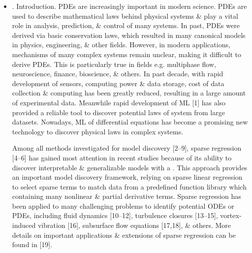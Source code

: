 \documentclass{article}
\begin{document}
\begin{itemize}
	\item {. Introduction.} PDEs are increasingly important in modern science. PDEs are used to describe mathematical laws behind physical systems \& play a vital role in analysis, prediction, \& control of many systems. In past, PDEs were derived via basic conservation laws, which resulted in many canonical models in physics, engineering, \& other fields. However, in modern applications, mechanisms of many complex systems remain unclear, making it difficult to derive PDEs. This is particularly true in fields e.g. multiphase flow, neuroscience, finance, bioscience, \& others. In past decade, with rapid development of sensors, computing power \& data storage, cost of data collection \& computing has been greatly reduced, resulting in a large amount of experimental data. Meanwhile rapid development of ML [1] has also provided a reliable tool to discover potential laws of system from large datasets. Nowadays, ML of differential equations has become a promising new technology to discover physical laws in complex systems.
	
	Among all methods investigated for model discovery [2--9], sparse regression [4--6] has gained most attention in recent studies because of its ability to discover interpretable \& generalizable models with a . This approach provides an important model discovery framework, relying on sparse linear regression to select sparse terms to match data from a predefined function library which containing many nonlinear \& partial derivative terms. Sparse regression has been applied to many challenging problems to identify potential ODEs or PDEs, including fluid dynamics [10--12], turbulence closures [13--15], vortex-induced vibration [16], subsurface flow equations [17,18], \& others. More details on important applications \& extensions of sparse regression can be found in [19].
	

\end{itemize}
\end{document}
